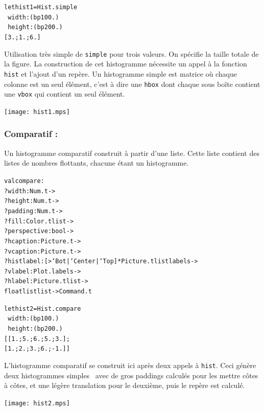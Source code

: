 \documentclass[a4paper,12pt]{article}
\begin{document}
\bigskip

\begin{minipage}{0.5\linewidth}
  \begin{alltt}
    let hist1 = Hist.simple
    ~width:(bp 100.)
    ~height:(bp 200.)
    [3.;1.;6.]
  \end{alltt}

  Utilisation très simple de \texttt{simple} pour trois valeurs. On spécifie la taille totale de la figure. La construction de cet histogramme nécessite un appel à la fonction \texttt{hist} et l'ajout d'un repère. Un histogramme simple est matrice où chaque colonne est un seul élément, c'est à dire une \texttt{hbox} dont chaque sous boîte contient une \texttt{vbox} qui contient un seul élément.
\end{minipage}
\begin{minipage}{0.5\linewidth}
  \begin{center}
    \texttt{[image: hist1.mps]}
  \end{center}
\end{minipage}

\subsubsection{Comparatif :} 
Un histogramme comparatif construit à partir d'une liste. Cette liste
contient des listes de nombres flottants, chacune étant un histogramme.
\begin{alltt}
  val compare :
  ?width:Num.t ->
  ?height:Num.t ->
  ?padding:Num.t ->
  ?fill:Color.t list ->
  ?perspective: bool ->
  ?hcaption:Picture.t ->
  ?vcaption:Picture.t ->
  ?histlabel:[> `Bot | `Center | `Top ] * Picture.t list labels ->
  ?vlabel:Plot.labels ->
  ?hlabel:Picture.t list ->
  float list list -> Command.t
\end{alltt}

\bigskip

\begin{minipage}{0.5\linewidth}
  \begin{alltt}
    let hist2 = Hist.compare
    ~width:(bp 100.)
    ~height:(bp 200.)
    [[1.;5.;6.;5.;3.];
      [1.;2.;3.;6.;-1.]]
  \end{alltt}
  
  L'histogramme comparatif se construit ici après deux appels à \texttt{hist}. Ceci génère deux histogrammes \og simples \fg\, avec de gros paddings calculés pour les mettre côtes à côtes, et une légère translation pour le deuxième, puis le repère est calculé.
\end{minipage}
\begin{minipage}{0.5\linewidth}
\begin{center}
\texttt{[image: hist2.mps]}
\end{center}
\end{minipage}
\end{document}
